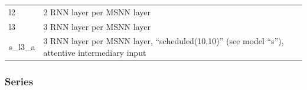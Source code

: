 \begin{longtable}[]{@{}ll@{}}
\begin{minipage}[t]{0.08\columnwidth}
l2\strut
\end{minipage} & \begin{minipage}[t]{0.86\columnwidth}\raggedright\strut
2 RNN layer per MSNN layer\strut
\end{minipage}\tabularnewline
\begin{minipage}[t]{0.08\columnwidth}\raggedright\strut
l3\strut
\end{minipage} & \begin{minipage}[t]{0.86\columnwidth}\raggedright\strut
3 RNN layer per MSNN layer\strut
\end{minipage}\tabularnewline
\begin{minipage}[t]{0.08\columnwidth}\raggedright\strut
s\_l3\_a\strut
\end{minipage} & \begin{minipage}[t]{0.86\columnwidth}\raggedright\strut
3 RNN layer per MSNN layer, ``scheduled(10,10)'' (see model ``s''),
attentive intermediary input\strut
\end{minipage}\tabularnewline
\bottomrule
\end{longtable}

\subsubsection{Series}\label{series}

